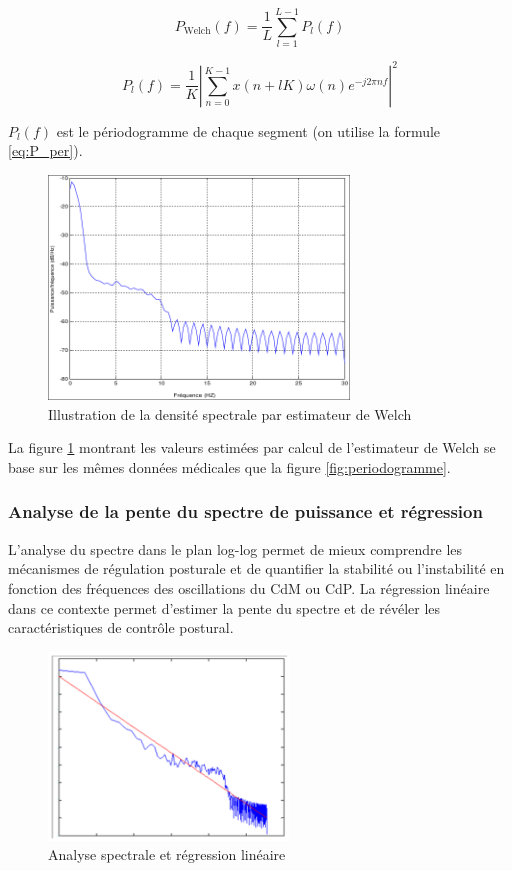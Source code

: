 \begin{equation}
  P_{\text{Welch}}(f)=\frac{1}{L}\sum\limits_{l=1}^{L-1}P_l(f)
  \label{eq:P_Welch}
\end{equation}

\begin{equation} 
  P_l(f) = \frac{1}{K}\left|\sum\limits_{n=0}^{K-1}x(n+lK)\omega(n)e^{-j2\pi nf}\right|^2
  \label{eq:P_l}
\end{equation}

$P_l(f)$ est le périodogramme de chaque segment (on utilise la formule \ref{eq:P_per}).

\begin{figure}[ht]
  \centering
  \includegraphics[width=8cm]{images/methode/welch.png}
  \caption{Illustration de la densité spectrale par estimateur de Welch}
  \label{fig:welch}
\end{figure}

La figure \ref{fig:welch} montrant les valeurs estimées par calcul de l'estimateur de Welch se base sur les mêmes données médicales que la figure \ref{fig:periodogramme}.

\subsubsection{Analyse de la pente du spectre de puissance et régression}

L’analyse du spectre dans le plan log-log permet de mieux comprendre les mécanismes de régulation posturale et de quantifier la stabilité ou l’instabilité en fonction des fréquences des oscillations du CdM ou CdP. 
La régression linéaire dans ce contexte permet d’estimer la pente du spectre et de révéler les caractéristiques de contrôle postural.

\begin{figure}[H]
    \centering
    \includegraphics[height=5cm]{images/methode/analyse_spec_regre_lin.png}
    \caption{Analyse spectrale et régression linéaire}\label{fig:regression_lineaire}
\end{figure}

